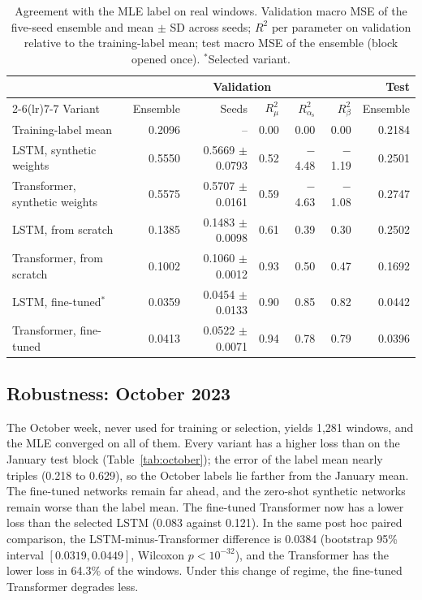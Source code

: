 \documentclass[preprint,12pt,authoryear]{elsarticle}
\newcommand{\aself}{\alpha_{\mathrm{s}}}
\begin{document}
\begin{table}[t]
\centering
\caption{Agreement with the MLE label on real windows. Validation macro MSE of the
five-seed ensemble and mean $\pm$ SD across seeds; $R^2$ per parameter on validation
relative to the training-label mean; test macro MSE of the ensemble (block opened once).
$^{\ast}$Selected variant.}
\label{tab:real}
\footnotesize
\setlength{\tabcolsep}{4pt}
\begin{tabular}{lrrrrrr}
\toprule
 & \multicolumn{5}{c}{Validation} & Test\\
\cmidrule(lr){2-6}\cmidrule(lr){7-7}
Variant & Ensemble & Seeds & $R^2_{\mu}$ & $R^2_{\aself}$ & $R^2_{\beta}$ & Ensemble\\
\midrule
Training-label mean & 0.2096 & -- & 0.00 & 0.00 & 0.00 & 0.2184\\
LSTM, synthetic weights & 0.5550 & 0.5669 $\pm$ 0.0793 & 0.52 & $-$4.48 & $-$1.19 & 0.2501\\
Transformer, synthetic weights & 0.5575 & 0.5707 $\pm$ 0.0161 & 0.59 & $-$4.63 & $-$1.08 & 0.2747\\
LSTM, from scratch & 0.1385 & 0.1483 $\pm$ 0.0098 & 0.61 & 0.39 & 0.30 & 0.2502\\
Transformer, from scratch & 0.1002 & 0.1060 $\pm$ 0.0012 & 0.93 & 0.50 & 0.47 & 0.1692\\
LSTM, fine-tuned$^{\ast}$ & 0.0359 & 0.0454 $\pm$ 0.0133 & 0.90 & 0.85 & 0.82 & 0.0442\\
Transformer, fine-tuned & 0.0413 & 0.0522 $\pm$ 0.0071 & 0.94 & 0.78 & 0.79 & 0.0396\\
\bottomrule
\end{tabular}
\end{table}

\subsection{Robustness: October 2023}

The October week, never used for training or selection, yields 1,281 windows, and the MLE
converged on all of them. Every variant has a higher loss than on the January test block
(Table~\ref{tab:october}); the error of the label mean nearly triples (0.218 to 0.629), so
the October labels lie farther from the January mean. The fine-tuned networks remain far
ahead, and the zero-shot synthetic networks remain worse than the label mean. The fine-tuned Transformer now has
a lower loss than the selected LSTM (0.083 against 0.121). In the same post hoc paired
comparison, the LSTM-minus-Transformer difference is 0.0384 (bootstrap 95\% interval
$[0.0319,0.0449]$, Wilcoxon $p<10^{-32}$), and the Transformer has the lower loss in 64.3\% of
the windows. Under this change of regime, the fine-tuned Transformer degrades less.
\end{document}
